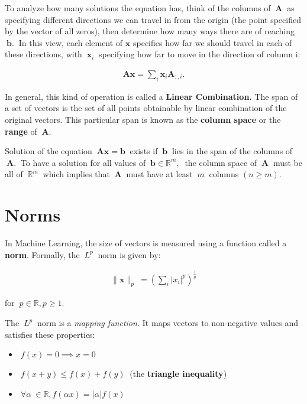 \documentclass[12pt]{article}
\begin{document}
To analyze how many solutions the equation has, think of the columns of $\ \mathbf{A}\ $ as specifying different directions we can travel in from the origin (the point specified by the vector of all zeros), then determine how many ways there are of reaching $\ \mathbf{b}.\ $ In this view, each element of $\mathbf{x}$ specifies how far we should travel in each of these directions, with $\ \mathbf{x}_{i}\ $ specifying how far to move in the direction of column i:

\begin{align}
\mathbf{A}\mathbf{x}=\sum _{i}\mathbf{x}_{i}\mathbf{A}_{:,i}.
\end{align}

In general, this kind of operation is called a \textbf{Linear Combination.} The span of a set of vectors is the set of all points obtainable by linear combination of the original vectors. This particular span is known as the \textbf{column space} or the \textbf{range} of $\ \mathbf{A}.$

Solution of the equation $\ \mathbf{A}\mathbf{x}=\mathbf{b}\ $ exists if $\ \mathbf{b}\ $ lies in the span of the columns of $\ \mathbf{A}.\ $ To have a solution for all values of $\ \mathbf{b}\in\mathbb{R}^{m},\ $ the column space of $\ \mathbf{A}\ $ must be all of $\ \mathbb{R}^{m}\ $ which implies that $\ \mathbf{A}\ $ must have at least $\ m\ $ columns $(n\geq m)$.

\section{Norms}

In Machine Learning, the size of vectors is measured using a function called a \textbf{norm}. Formally, the $\ L^{p}\ $ norm is given by:

\begin{align}
\|\mathbf{x}\|_{p} \  = \left( \sum_i \left| x_i \right| ^p \right) ^ {\frac {1}{p}}
\end{align}

for $\ p \in \mathbb{R}, p \ge 1. \ $

The $\ L^{p}\ $ norm is a \textit{mapping function.} It maps vectors to non-negative values and satisfies these properties:

\begin{itemize}
    \item $\ f(x) = 0 \implies x = 0 \ $
    \item $\ f(x+y) \le f(x) + f(y)\ $ (the \textbf{triangle inequality})
    \item $\ \forall \alpha \ \in \mathbb{R}, f(\alpha x) = \left| \alpha \right|f(x) \ $
\end{itemize}
\end{document}

